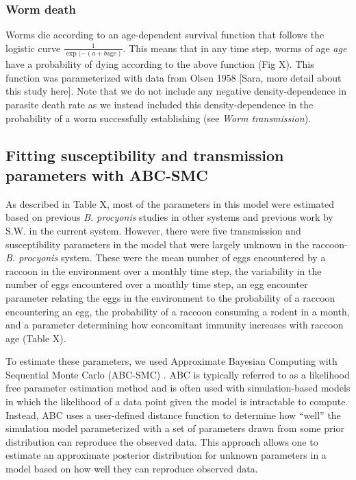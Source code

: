 \documentclass[11pt]{article}
\begin{document}
\subsubsection{Worm death}

Worms die according to an age-dependent survival function that follows the logistic curve $\frac{1}{\exp(-(a + b \text{age})}$.  This means that in any time step, worms of age \emph{age} have a probability of dying according to the above function (Fig X).  This function was parameterized with data from Olsen 1958 [Sara, more detail about this study here].  Note that we do not include any negative density-dependence in parasite death rate as we instead included this density-dependence in the probability of a worm successfully establishing (see \emph{Worm transmission}).

\subsection{Fitting susceptibility and transmission parameters with ABC-SMC}

As described in Table X, most of the parameters in this model were
estimated based on previous \emph{B. procyonis} studies in other systems
and previous work by S.W. in the current system. However, there were
five transmission and susceptibility parameters in the model that were
largely unknown in the raccoon-\emph{B. procyonis} system. These were
the mean number of eggs encountered by a raccoon in the environment over
a monthly time step, the variability in the number of eggs encountered
over a monthly time step, an egg encounter parameter relating the eggs
in the environment to the probability of a raccoon encountering an egg,
the probability of a raccoon consuming a rodent in a month, and a
parameter determining how concomitant immunity increases with raccoon
age (Table X).

To estimate these parameters, we used Approximate Bayesian Computing
with Sequential Monte Carlo (ABC-SMC) \citep{Sisson2009,Beaumont2010,Kosmala2015}. ABC is typically referred to as a likelihood
free parameter estimation method and is often used with simulation-based
models in which the likelihood of a data point given the model is
intractable to compute. Instead, ABC uses a user-defined distance
function to determine how ``well'' the simulation model parameterized
with a set of parameters drawn from some prior distribution can
reproduce the observed data. This approach allows one to estimate an
approximate posterior distribution for unknown parameters in a model based
on how well they can reproduce observed data.
\end{document}
